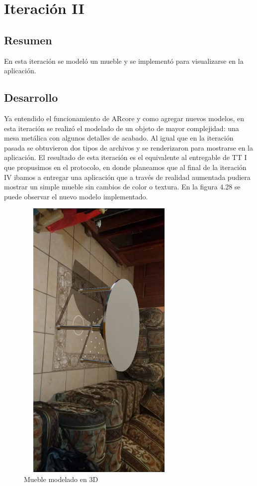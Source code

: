 \section{Iteración II}
\subsection{Resumen}
En esta iteración se modeló un mueble y se implementó para visualizarse en la aplicación.
\subsection{Desarrollo}
Ya entendido el funcionamiento de ARcore y como agregar nuevos modelos, en esta iteración se realizó el modelado de un objeto de mayor complejidad: una mesa metálica con algunos detalles de acabado. Al igual que en la iteración pasada se obtuvieron dos tipos de archivos y se renderizaron para mostrarse en la aplicación. El resultado de esta iteración es el equivalente al entregable de TT I que propusimos en el protocolo, en donde planeamos que al final de la iteración IV ibamos a entregar una aplicación que a través de realidad aumentada pudiera mostrar un simple mueble sin cambios de color o textura.
En la figura 4.28 se puede observar el nuevo modelo implementado.
\begin{figure}[H]
	\centering
	\includegraphics[width=8cm,height=14cm,angle=90]{imagenes/iteraciones/AR3.png}
	\caption{Mueble modelado en 3D}
	\label{fig:analogo}
\end{figure} 
\clearpage